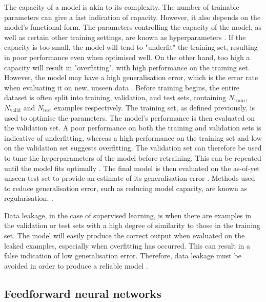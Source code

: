 \documentclass[12pt]{article}
\begin{document}
The capacity of a model is akin to its complexity. The number of trainable parameters can give a fast indication of capacity. However, it also depends on the model's functional form. The parameters controlling the capacity of the model, as well as certain other training settings, are known as hyperparameters \cite{Goodfellow16}. If the capacity is too small, the model will tend to "underfit" the training set, resulting in poor performance even when optimised well. On the other hand, too high a capacity will result in "overfitting", with high performance on the training set. However, the model may have a high generalisation error, which is the error rate when evaluating it on new, unseen data \cite{Murphy12, Goodfellow16}. Before training begins, the entire dataset is often split into training, validation, and test sets, containing $N_{\mathrm{train}}$, $N_{\mathrm{valid}}$ and $N_{\mathrm{test}}$ examples respectively. The training set, as defined previously, is used to optimise the parameters. The model's performance is then evaluated on the validation set. A poor performance on both the training and validation sets is indicative of underfitting, whereas a high performance on the training set and low on the validation set suggests overfitting. The validation set can therefore be used to tune the hyperparameters of the model before retraining. This can be repeated until the model fits optimally \cite{Murphy12, Goodfellow16}. The final model is then evaluated on the as-of-yet unseen test set to provide an estimate of its generalisation error \cite{Murphy12}. Methods used to reduce generalisation error, such as reducing model capacity, are known as regularisation. \cite{Goodfellow16}.

Data leakage, in the case of supervised learning, is when there are examples in the validation or test sets with a high degree of similarity to those in the training set. The model will easily produce the correct output when evaluated on the leaked examples, especially when overfitting has occurred. This can result in a false indication of low generalisation error. Therefore, data leakage must be avoided in order to produce a reliable model \cite{Kaufman12}.
\subsection{Feedforward neural networks}
\end{document}
